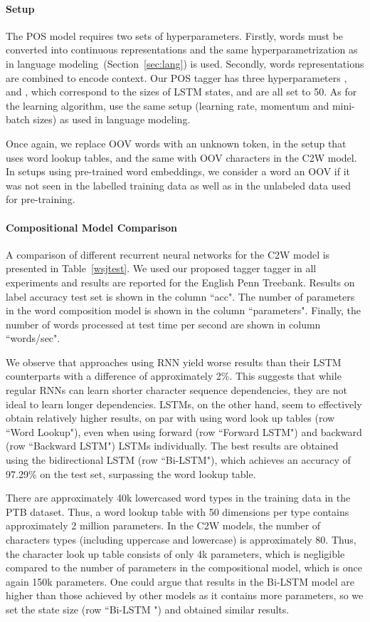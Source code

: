 \documentclass[11pt]{article}
\begin{document}
\begin{CJK*}{UTF8}{gbsn}
\paragraph{Setup}
The POS model requires two sets of hyperparameters. Firstly, words must be converted into continuous representations and the same hyperparametrization as in language modeling~(Section~\ref{sec:lang}) is used. Secondly, words representations are combined to encode context. Our POS tagger has three hyperparameters ,  and , which correspond to the sizes of LSTM states, and are all set to 50. As for the learning algorithm, use the same setup (learning rate, momentum and mini-batch sizes) as used in language modeling.

Once again, we replace OOV words with an unknown token, in the setup that uses word lookup tables, and the same with OOV characters in the C2W model. In setups using pre-trained word embeddings, we consider a word an OOV if it was not seen in the labelled training data as well as in the unlabeled data used for pre-training.

\paragraph{Compositional Model Comparison}
A comparison of different recurrent neural networks for the C2W model is presented in Table~\ref{wsjtest}. We used our proposed tagger tagger in all experiments and results are reported for the English Penn Treebank. Results on label accuracy test set is shown in the column ``acc". The number of parameters in the word composition model is shown in the column ``parameters". Finally, the number of words processed at test time per second are shown in column ``words/sec".

We observe that approaches using RNN yield worse results than their LSTM counterparts with a difference of approximately 2\%.  This suggests that while regular RNNs can learn shorter character sequence dependencies, they are not ideal to learn longer dependencies. LSTMs, on the other hand, seem to effectively obtain relatively higher results, on par with using word look up tables (row ``Word Lookup"), even when using forward (row ``Forward LSTM") and backward (row ``Backward LSTM") LSTMs individually. The best results are obtained using the bidirectional LSTM (row ``Bi-LSTM"), which achieves an accuracy of 97.29\% on the test set, surpassing the word lookup table. 

There are approximately 40k lowercased word types in the training data in the PTB dataset. Thus, a word lookup table with 50 dimensions per type contains approximately 2 million parameters. In the C2W models, the number of characters types (including uppercase and lowercase) is approximately 80. Thus, the character look up table consists of only 4k parameters, which is negligible compared to the number of parameters in the compositional model, which is once again 150k parameters. One could argue that results in the Bi-LSTM model are higher than those achieved by other models as it contains more parameters, so we set the state size  (row ``Bi-LSTM ") and obtained similar results.


\end{CJK*}
\end{document}
